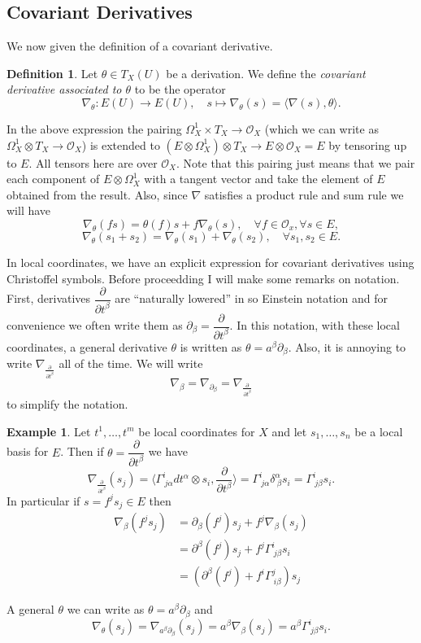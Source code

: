 \documentclass[12pt]{book}
\numberwithin{equation}{section}
\theoremstyle{definition}
\newtheorem{definition}[theorem]{Definition}
\newtheorem{example}[theorem]{Example}
\theoremstyle{remark}
\newcommand{\Ocal}{\mathcal{O}}
\begin{document}
\subsection{Covariant Derivatives}
We now given the definition of a covariant derivative.
\begin{definition}
	Let $\theta \in T_X(U)$ be a derivation.
	We define the \emph{covariant derivative associated to $\theta$} to be the operator 
	$$ \nabla_{\theta}\colon E(U) \to E(U), \quad s\mapsto \nabla_{\theta}(s) = \langle \nabla(s),\theta\rangle.$$
\end{definition}
In the above expression the pairing $\Omega_X^1 \times T_X\to \Ocal_X$ (which we can write as $\Omega_X^1\otimes T_X \to \Ocal_X$) is extended to $(E\otimes \Omega_X^1)\otimes T_X \to E\otimes \Ocal_X= E$ by tensoring up to $E$.
All tensors here are over $\Ocal_X$.
Note that this pairing just means that we pair each component of $E\otimes \Omega^1_X$ with a tangent vector and take the element of $E$ obtained from the result. 
Also, since $\nabla$ satisfies a product rule and sum rule we will have 
$$ \nabla_{\theta}(fs) = \theta(f) s + f \nabla_{\theta}(s), \quad \forall f \in \Ocal_x, \forall s \in E,$$
$$\nabla_{\theta}(s_1+s_2) = \nabla_{\theta}(s_1) + \nabla_{\theta}(s_2), \quad \forall s_1,s_2 \in E.$$


In local coordinates, we have an explicit expression for covariant derivatives using Christoffel symbols.
Before proceedding I will make some remarks on notation.
First, derivatives $\dfrac{\partial}{\partial t^{\beta}}$ are ``naturally lowered'' in so Einstein notation and for convenience we often write them as $\partial_{\beta} = \dfrac{\partial}{\partial t^{\beta}}$.
In this notation, with these local coordinates, a general derivative $\theta$ is written as $\theta = a^{\beta}\partial_{\beta}$. 
Also, it is annoying to write $\nabla_{\frac{\partial}{\partial t^\beta}}$ all of the time.
We will write 
$$ \nabla_{\beta} = \nabla_{\partial_{\beta}} = \nabla_{\frac{\partial}{\partial t^{\beta}}}$$
to simplify the notation.
\begin{example}
	Let $t^1,\ldots,t^m$ be local coordinates for $X$ and let $s_1,\ldots, s_n$ be a local basis for $E$. 
	Then if $\theta = \dfrac{\partial}{\partial t^{\beta}}$ we have
	$$\nabla_{\frac{\partial}{\partial t^{\beta}}}(s_j) = \langle \Gamma^i_{\ j \alpha} dt^{\alpha} \otimes s_i, \dfrac{\partial}{\partial t^{\beta}} \rangle 
	= \Gamma^i_{\ j \alpha} \delta^{\alpha}_{\ \beta} s_i 
	= \Gamma^i_{\ j \beta} s_i.$$
	In particular if $s = f^js_j\in E$ then 
	\begin{align*}
	\nabla_{\beta}(f^js_j) &=\partial_{\beta}(f^j)s_j + f^j \nabla_{\beta}(s_j) \\
	&= \partial^{\beta}(f^j)s_j + f^j \Gamma^i_{\ j \beta} s_i\\
	&= \left(\partial^{\beta}(f^j) + f^i \Gamma^j_{\ i \beta} \right) s_j 
	\end{align*}
	
	
	A general $\theta$ we can write as $\theta = a^{\beta}\partial_{\beta}$ and
	$$\nabla_{\theta}(s_j) = \nabla_{a^{\beta} \partial_{\beta}}(s_j) = a^{\beta}\nabla_{\beta}(s_j)=a^{\beta}\Gamma^i_{\ j \beta}s_i. $$
\end{example}
\end{document}

